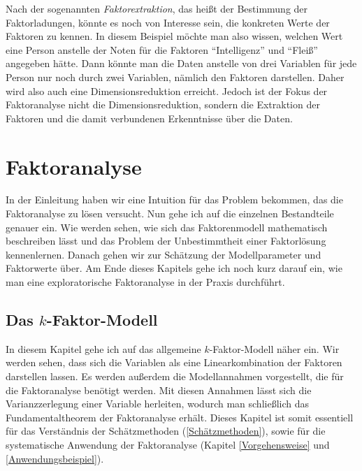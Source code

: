 \documentclass[11pt]{scrartcl}
\begin{document}
	Nach der sogenannten \textit{Faktorextraktion}, das heißt der Bestimmung der Faktorladungen, könnte es noch
	von Interesse sein, die konkreten Werte der Faktoren zu kennen. In diesem Beispiel möchte man also
	wissen, welchen Wert eine Person anstelle der Noten für die Faktoren \enquote{Intelligenz} und \enquote{Fleiß} angegeben hätte. Dann könnte man
	die Daten anstelle von drei Variablen für jede Person nur noch durch zwei Variablen, nämlich den Faktoren darstellen.
	Daher wird also auch eine Dimensionsreduktion erreicht. Jedoch ist der Fokus der Faktoranalyse nicht
	die Dimensionsreduktion, sondern die Extraktion der Faktoren und die damit verbundenen Erkenntnisse über die Daten.
	
	\newpage
	\section{Faktoranalyse}
	
	In der Einleitung haben wir eine Intuition für das Problem bekommen,
	das die Faktoranalyse zu lösen versucht. Nun gehe ich auf die einzelnen
	Bestandteile genauer ein. Wie werden sehen, wie sich das Faktorenmodell
	mathematisch beschreiben lässt und das Problem der Unbestimmtheit
	einer Faktorlösung kennenlernen. Danach gehen wir zur Schätzung der
	Modellparameter und Faktorwerte über. Am Ende
	dieses Kapitels gehe ich noch kurz darauf ein, wie man eine exploratorische
	Faktoranalyse in der Praxis durchführt.
	
	\subsection{Das $k$-Faktor-Modell} \label{Faktorenmodell}
	In diesem Kapitel gehe ich auf das allgemeine $k$-Faktor-Modell näher ein.
	Wir werden sehen, dass sich die Variablen als eine Linearkombination der Faktoren
	darstellen lassen. Es werden außerdem die Modellannahmen vorgestellt, die für
	die Faktoranalyse benötigt werden.
	Mit diesen Annahmen lässt sich die Varianzzerlegung einer Variable herleiten, wodurch
	man schließlich das Fundamentaltheorem der Faktoranalyse erhält.
	Dieses Kapitel ist somit essentiell für das Verständnis der Schätzmethoden
	(\ref{Schätzmethoden}), sowie für die systematische Anwendung der Faktoranalyse
	(Kapitel \ref{Vorgehensweise} und \ref{Anwendungsbeispiel}).
	
\end{document}
